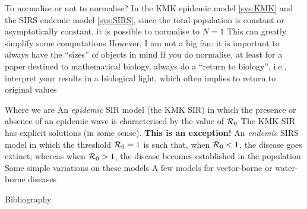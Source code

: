 \documentclass[aspectratio=169]{beamer}\usepackage[]{graphicx}\usepackage[]{xcolor}
\makeatletter
\newcommand{\hlnum}[1]{\textcolor[rgb]{0.686,0.059,0.569}{#1}}%
\newcommand{\hlsng}[1]{\textcolor[rgb]{0.192,0.494,0.8}{#1}}%
\newcommand{\hlcom}[1]{\textcolor[rgb]{0.678,0.584,0.686}{\textit{#1}}}%
\newcommand{\hlopt}[1]{\textcolor[rgb]{0,0,0}{#1}}%
\newcommand{\hldef}[1]{\textcolor[rgb]{0.345,0.345,0.345}{#1}}%
\newcommand{\hlkwa}[1]{\textcolor[rgb]{0.161,0.373,0.58}{\textbf{#1}}}%
\newcommand{\hlkwb}[1]{\textcolor[rgb]{0.69,0.353,0.396}{#1}}%
\newcommand{\hlkwc}[1]{\textcolor[rgb]{0.333,0.667,0.333}{#1}}%
\newcommand{\hlkwd}[1]{\textcolor[rgb]{0.737,0.353,0.396}{\textbf{#1}}}%
\newenvironment{kframe}{%
 \def\at@end@of@kframe{}%
 \ifinner\ifhmode%
  \def\at@end@of@kframe{\end{minipage}}%
  \begin{minipage}{\columnwidth}%
 \fi\fi%
 \def\FrameCommand##1{\hskip\@totalleftmargin \hskip-\fboxsep
 \colorbox{shadecolor}{##1}\hskip-\fboxsep
     \hskip-\linewidth \hskip-\@totalleftmargin \hskip\columnwidth}%
 \MakeFramed {\advance\hsize-\width
   \@totalleftmargin\z@ \linewidth\hsize
   \@setminipage}}%
 {\par\unskip\endMakeFramed%
 \at@end@of@kframe}
\newenvironment{knitrout}{}{} %
\makeatother
\begin{document}
\begin{frame}{To normalise or not to normalise?}
\bbullet In the KMK epidemic model \eqref{sys:KMK} and the SIRS endemic model \eqref{sys:SIRS}, since the total population is constant or asymptotically constant, it is possible to normalise to $N=1$
\vfill
\bbullet This can greatly simplify some computations
\vfill
\bbullet However, I am not a big fan: it is important to always have the ``sizes'' of objects in mind
\vfill
\bbullet If you do normalise, at least for a paper destined to mathematical biology, always do a ``return to biology'', i.e., interpret your results in a biological light, which often implies to return to original values
\end{frame}

\begin{frame}{Where we are}
\bbullet An \emph{epidemic} SIR model (the KMK SIR) in which the presence or absence of an epidemic wave is characterised by the value of $\mathcal{R}_0$
\vfill
\bbullet The KMK SIR has explicit solutions (in some sense). \textbf{This is an exception!}
\vfill
\bbullet An \emph{endemic} SIRS model in which the threshold $\mathcal{R}_0=1$ is such that, when $\mathcal{R}_0<1$, the disease goes extinct, whereas when $\mathcal{R}_0>1$, the disease becomes established in the population
\vfill
\bbullet Some simple variations on these models
\vfill
\bbullet A few models for vector-borne or water-borne diseases
\end{frame}



\begin{frame}[allowframebreaks]{Bibliography}


\end{frame}
\end{document}

